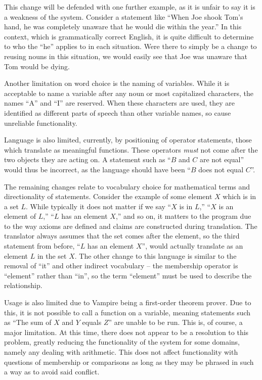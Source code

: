 This change will be defended with one further example, as it is unfair to say it is a weakness of the system. Consider a statement like ``When Joe shook Tom's hand, he was completely unaware that he would die within the year.'' In this context, which is grammatically correct English, it is quite difficult to determine to who the ``he'' applies to in each situation. Were there to simply be a change to reusing nouns in this situation, we would easily see that Joe was unaware that Tom would be dying.

Another limitation on word choice is the naming of variables. While it is acceptable to name a variable after any noun or most capitalized characters, the names ``A'' and ``I'' are reserved. When these characters are used, they are identified as different parts of speech than other variable names, so cause unreliable functionality.

Language is also limited, currently, by positioning of operator statements, those which translate as meaningful functions. These operators \textit{must} not come after the two objects they are acting on. A statement such as ``$B$ and $C$ are not equal'' would thus be incorrect, as the language should have been ``$B$ does not equal $C$''.

The remaining changes relate to vocabulary choice for mathematical terms and directionality of statements. Consider the example of some element $X$ which is in a set $L$. While typically it does not matter if we say ``$X$ is in $L$,'' ``$X$ is an element of $L$,'' ``$L$ has an element $X$,'' and so on, it matters to the program due to the way axioms are defined and claims are constructed during translation. The translator always assumes that the set comes after the element, so the third statement from before, ``$L$ has an element $X$'', would actually translate as an element $L$ in the set $X$. The other change to this language is similar to the removal of ``it'' and other indirect vocabulary -- the membership operator is ``element'' rather than ``in'', so the term ``element'' must be used to describe the relationship.

Usage is also limited due to Vampire being a first-order theorem prover. Due to this, it is not possible to call a function on a variable, meaning statements such as ``The sum of $X$ and $Y$ equals $Z$'' are unable to be run. This is, of course, a major limitation. At this time, there does not appear to be a resolution to this problem, greatly reducing the functionality of the system for some domains, namely any dealing with arithmetic. This does not affect functionality with questions of membership or comparisons as long as they may be phrased in such a way as to avoid said conflict.

